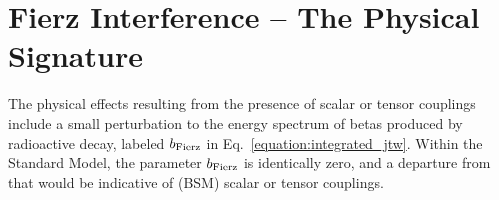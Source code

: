 

\FloatBarrier  %
\section{Fierz Interference -- The Physical Signature}
\label{signature_chapter}
The physical effects resulting from the presence of scalar or tensor couplings include a small perturbation to the energy spectrum of betas produced by radioactive decay, labeled $b_{\mathrm{Fierz}}$ in Eq.~\ref{equation:integrated_jtw}.  Within the Standard Model, the parameter $b_{\mathrm{Fierz}}$ is identically zero, and a departure from that would be indicative of (BSM) scalar or tensor couplings.  

